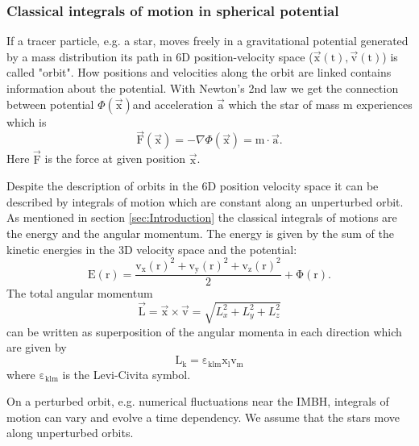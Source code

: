 \subsubsection{Classical integrals of motion in spherical potential}\label{sec:iof}
If a tracer particle, e.g. a star, moves freely in a gravitational potential generated by a mass distribution its path in 6D position-velocity space (\(\vec{\mathrm{x}}(\mathrm{t}),\vec{\mathrm{v}}(\mathrm{t})\)) is called "orbit".
How positions and velocities along the orbit are linked contains information about the potential. With Newton's 2nd law we get the connection between potential \(\Phi(\vec{\mathrm{x}})\)and acceleration \(\vec{\mathrm{a}}\) which the star of mass m experiences which is 
\begin{equation}\label{eq:Newton}
\vec{\mathrm{F}}(\vec{\mathrm{x}})=-\nabla\Phi(\vec{\mathrm{x}})=\mathrm{m}\cdot\vec{\mathrm{a}}.  
\end{equation}
Here \(\vec{\mathrm{F}}\) is the force at given position \(\vec{\mathrm{x}}\).
\par Despite the description of orbits in the 6D position velocity space it can be described by integrals of motion which are constant along an unperturbed orbit. As mentioned in section \ref{sec:Introduction} the classical integrals of motions are the energy and the angular momentum. The energy is given by the sum of the kinetic energies in the 3D velocity space and the potential:
\begin{equation}\label{eq:energy}
\mathrm{E(r)=\frac{v_x(r)^2+v_y(r)^2+v_z(r)^2}{2}+\Phi(r)}.
\end{equation}
The total angular momentum
\begin{equation}\label{eq:total_ang_mom}
\vec{\mathrm{L}}=\vec{\mathrm{x}}\times\vec{\mathrm{v}}=\sqrt{L_x^2+L_y^2+L_z^2}
\end{equation}
can be written as superposition of the angular momenta in each direction which are given by 
\begin{equation}\label{eq:ang_mom}
\mathrm{L_k=\varepsilon_{klm}x_l v_m}
\end{equation}
where \(\mathrm{\varepsilon_{klm}}\) is the Levi-Civita symbol.  
\par On a perturbed orbit, e.g. numerical fluctuations near the \ac{IMBH}, integrals of motion can vary and evolve a time dependency. We assume that the stars move along unperturbed orbits. 

